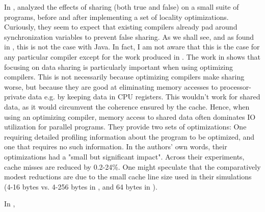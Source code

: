 In \citeyear{TorrellasShared}, \citeauthor{TorrellasShared}
\cite{TorrellasShared} analyzed the effects of sharing (both true and false)
on a small suite of programs, before and after implementing a set of locality
optimizations. Curiously, they seem to expect that existing compilers already
pad around synchronization variables to prevent false sharing. As we shall see,
and as found in \cite{mystery}, this is not the case with Java. In fact, I am
not aware that this is the case for any particular compiler except for the work
produced in \cite{EggersReducing} .
The work in \cite{TorrellasShared} shows that focusing on data sharing is particularly important when
using optimizing compilers. This is not necessarily because optimizing compilers
make sharing worse, but because they are good at eliminating memory accesses to
processor-private data e.g. by keeping data in CPU registers. This wouldn't work
for shared data, as it would circumvent the coherence ensured by the cache.
Hence, when using an optimizing compiler, memory access to shared data often
dominates IO utilization for parallel programs. They provide two sets of
optimizations: One requiring detailed profiling information about the program to
be optimized, and one that requires no such information. In the authors' own
words, their optimizations had a "small but significant impact". Across their
experiments, cache misses are reduced by 0.2-24\%. One might speculate that the
comparatively modest reductions are due to the small cache line size used in
their simulations (4-16 bytes vs. 4-256 bytes in \cite{EggersReducing}, and 64
bytes in \cite{mystery}).

In \citeyear{falsedef},
\citeauthor{falsedef} \cite{falsedef}



